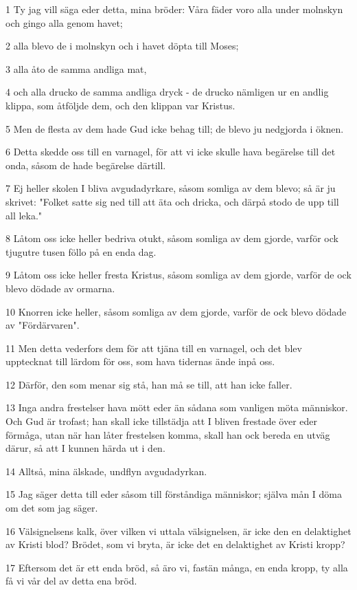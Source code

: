 \par 1 Ty jag vill säga eder detta, mina bröder: Våra fäder voro alla under molnskyn och gingo alla genom havet;
\par 2 alla blevo de i molnskyn och i havet döpta till Moses;
\par 3 alla åto de samma andliga mat,
\par 4 och alla drucko de samma andliga dryck - de drucko nämligen ur en andlig klippa, som åtföljde dem, och den klippan var Kristus.
\par 5 Men de flesta av dem hade Gud icke behag till; de blevo ju nedgjorda i öknen.
\par 6 Detta skedde oss till en varnagel, för att vi icke skulle hava begärelse till det onda, såsom de hade begärelse därtill.
\par 7 Ej heller skolen I bliva avgudadyrkare, såsom somliga av dem blevo; så är ju skrivet: "Folket satte sig ned till att äta och dricka, och därpå stodo de upp till all leka."
\par 8 Låtom oss icke heller bedriva otukt, såsom somliga av dem gjorde, varför ock tjugutre tusen föllo på en enda dag.
\par 9 Låtom oss icke heller fresta Kristus, såsom somliga av dem gjorde, varför de ock blevo dödade av ormarna.
\par 10 Knorren icke heller, såsom somliga av dem gjorde, varför de ock blevo dödade av "Fördärvaren".
\par 11 Men detta vederfors dem för att tjäna till en varnagel, och det blev upptecknat till lärdom för oss, som hava tidernas ände inpå oss.
\par 12 Därför, den som menar sig stå, han må se till, att han icke faller.
\par 13 Inga andra frestelser hava mött eder än sådana som vanligen möta människor. Och Gud är trofast; han skall icke tillstädja att I bliven frestade över eder förmåga, utan när han låter frestelsen komma, skall han ock bereda en utväg därur, så att I kunnen härda ut i den.
\par 14 Alltså, mina älskade, undflyn avgudadyrkan.
\par 15 Jag säger detta till eder såsom till förståndiga människor; själva mån I döma om det som jag säger.
\par 16 Välsignelsens kalk, över vilken vi uttala välsignelsen, är icke den en delaktighet av Kristi blod? Brödet, som vi bryta, är icke det en delaktighet av Kristi kropp?
\par 17 Eftersom det är ett enda bröd, så äro vi, fastän många, en enda kropp, ty alla få vi vår del av detta ena bröd.
